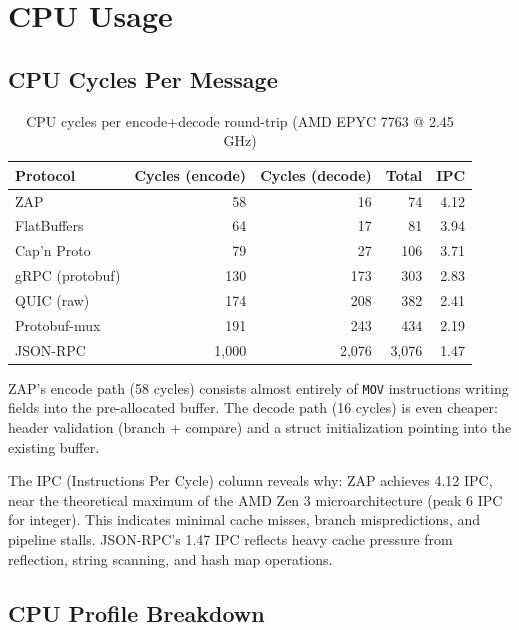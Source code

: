 \section{CPU Usage}


\subsection{CPU Cycles Per Message}

\begin{table}[h]
\centering
\caption{CPU cycles per encode+decode round-trip (AMD EPYC 7763 @ 2.45 GHz)}
\label{tab:cpu}
\begin{tabular}{lrrrr}
\toprule
\textbf{Protocol} & \textbf{Cycles (encode)} & \textbf{Cycles (decode)} & \textbf{Total} & \textbf{IPC} \\
\midrule
\rowcolor{luxblue!10}
ZAP & 58 & 16 & 74 & 4.12 \\
FlatBuffers & 64 & 17 & 81 & 3.94 \\
Cap'n Proto & 79 & 27 & 106 & 3.71 \\
gRPC (protobuf) & 130 & 173 & 303 & 2.83 \\
QUIC (raw) & 174 & 208 & 382 & 2.41 \\
Protobuf-mux & 191 & 243 & 434 & 2.19 \\
JSON-RPC & 1,000 & 2,076 & 3,076 & 1.47 \\
\bottomrule
\end{tabular}
\end{table}

ZAP's encode path (58 cycles) consists almost entirely of \texttt{MOV} instructions writing fields into the pre-allocated buffer. The decode path (16 cycles) is even cheaper: header validation (branch + compare) and a struct initialization pointing into the existing buffer.

The IPC (Instructions Per Cycle) column reveals why: ZAP achieves 4.12 IPC, near the theoretical maximum of the AMD Zen 3 microarchitecture (peak 6 IPC for integer). This indicates minimal cache misses, branch mispredictions, and pipeline stalls. JSON-RPC's 1.47 IPC reflects heavy cache pressure from reflection, string scanning, and hash map operations.

\subsection{CPU Profile Breakdown}

